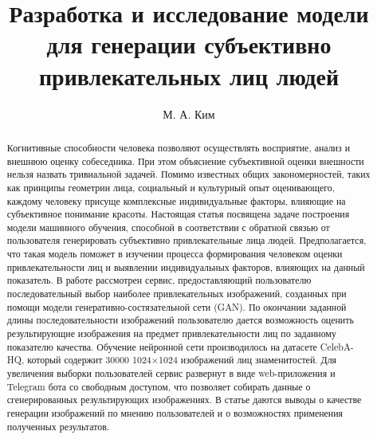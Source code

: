 \documentclass[60x84/16,8pt]{ittmm}
\begin{document}

\title{Разработка и исследование модели для генерации субъективно привлекательных лиц людей}

\author[1]{М. А. Ким}

\address[1]{Кафедра математического моделирования и искусственного интеллекта,\\
  Российский университет дружбы народов,\\
  ул. Миклухо-Маклая, д.6, Москва, Россия, 117198}


\begin{abstract}
Когнитивные способности человека позволяют осуществлять восприятие, анализ и внешнюю оценку собеседника.
При этом объяснение субъективной оценки внешности нельзя назвать тривиальной задачей.
Помимо известных общих закономерностей, таких как принципы геометрии лица, социальный и культурный опыт оценивающего,
каждому человеку присуще комплексные индивидуальные факторы, влияющие на субъективное понимание красоты.
Настоящая статья посвящена задаче построения модели машинного обучения, способной в соответствии с обратной
связью от пользователя генерировать субъективно привлекательные лица людей. Предполагается, что такая модель
поможет в изучении процесса формирования человеком оценки привлекательности лиц и выявлении индивидуальных факторов,
влияющих на данный показатель. В работе рассмотрен сервис, предоставляющий пользователю последовательный выбор наиболее привлекательных изображений,
созданных при помощи модели генеративно-состязательной сети (GAN). По окончании заданной длины последовательности изображений
пользователю дается возможность оценить результирующие изображения на предмет привлекательности лиц по заданному показателю качества.
Обучение нейронной сети производилось на датасете CelebA-HQ, который содержит 30000 1024×1024 изображений лиц знаменитостей.
Для увеличения выборки пользователей сервис развернут в виде web-приложения и Telegram бота со свободным доступом, что позволяет
собирать данные о сгенерированных результирующих изображениях. В статье даются выводы о качестве генерации изображений по мнению
пользователей и о возможностях применения полученных результатов.
\end{abstract}

\end{document}

